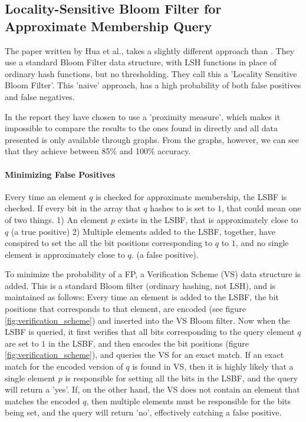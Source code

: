 \documentclass[a4paper,11pt]{article}
\begin{document}
\subsection{Locality-Sensitive Bloom Filter for Approximate Membership Query}
The paper written by Hua et al.\cite{paper:hua}, takes a slightly different approach than \cite{paper:harvard}. They use a standard Bloom Filter data structure, with LSH functions in place of ordinary hash functions, but no thresholding. They call this a 'Locality Sensitive Bloom Filter'. This 'naive' approach, has a high probability of both false positives and false negatives.

In the report they have chosen to use a 'proximity measure', which makes it impossible to compare the results to the ones found in \cite{paper:harvard} directly and all data presented is only available through graphs. From the graphs, however, we can see that they achieve between 85\% and 100\% accuracy.

\paragraph{Minimizing False Positives}
Every time an element $q$ is checked for approximate membership, the LSBF is checked. If every bit in the array that $q$ hashes to is set to $1$, that could mean one of two things.
1) An element $p$ exists in the LSBF, that is approximately close to $q$ (a true positive)
2) Multiple elements added to the LSBF, together, have conspired to set the all the bit positions corresponding to $q$ to $1$, and no single element is approximately close to $q$. (a false positive).

To minimize the probability of a FP, a Verification Scheme (VS) data structure is added.
This is a standard Bloom filter (ordinary hashing, not LSH), and is maintained as follows: Every time an element is added to the LSBF, the bit positions that corresponds to that element, are encoded (see figure \ref{fig:verification_scheme}) and inserted into the VS Bloom filter.
Now when the LSBF is queried, it first verifies that all bits corresponding to the query element $q$ are set to $1$ in the LSBF, and then encodes the bit positions (figure \ref{fig:verification_scheme}), and queries the VS for an exact match. If an exact match for the encoded version of $q$ is found in VS, then it is highly likely that a single element $p$ is responsible for setting all the bits in the LSBF, and the query will return a 'yes'. If, on the other hand, the VS does not contain an element that matches the encoded $q$, then multiple elements must be responsible for the bits being set, and the query will return 'no', effectively catching a false positive.
\end{document}
